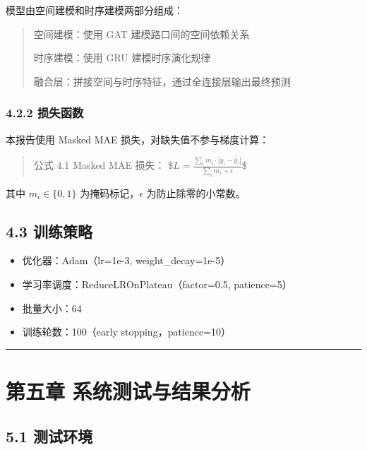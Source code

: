 \documentclass{harryopo-report}
\begin{document}
模型由{\fzht 空间建模}和{\fzht 时序建模}两部分组成：

\begin{quote}
{\fzht 空间建模}：使用 GAT 建模路口间的空间依赖关系

{\fzht 时序建模}：使用 GRU 建模时序演化规律

{\fzht 融合层}：拼接空间与时序特征，通过全连接层输出最终预测
\end{quote}

\subsection*{4.2.2 损失函数}

本报告使用 Masked MAE 损失，对缺失值不参与梯度计算：

\begin{quote}
{\fzht 公式 4.1} Masked MAE 损失：
\$$L = \frac{\sum_{i} m_i \cdot |y_i - \hat{y}_i|}{\sum_{i} m_i + \epsilon}$\$
\end{quote}

其中 $m_i \in \{0, 1\}$ 为掩码标记，$\epsilon$ 为防止除零的小常数。

\section*{4.3 训练策略}

\begin{itemize}
  \item {\fzht 优化器}：Adam（lr=1e-3, weight\_decay=1e-5）
  \item {\fzht 学习率调度}：ReduceLROnPlateau（factor=0.5, patience=5）
  \item {\fzht 批量大小}：64
  \item {\fzht 训练轮数}：100（early stopping，patience=10）
\end{itemize}

\medskip\hrule\medskip

\chapter*{第五章 系统测试与结果分析}

\section*{5.1 测试环境}
\end{document}
